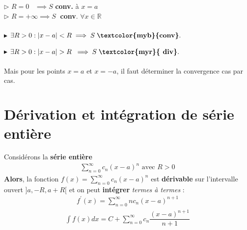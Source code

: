 \documentclass{report}
\begin{document}
\begin{multicols*}{3}
            \noindent$\rhd$
                $R = 0 \;\;\; \implies S$ \; 
                \textcolor{myb}{\textbf{conv.}}  à $x = a$ 
            \\
            $\rhd$  $R = +\infty \implies S \;$ 
            \textbf{conv}. \; $\forall x \in \mathbb{R}$  
            \\ \\
            $\blacktriangleright$ 
            $\exists R > 0 : |x - a| < R \implies  S \; \textbf{\textcolor{myb}{conv}}.$

            \noindent 
            $\blacktriangleright$ $\exists R > 0 : |x - a| > R \; \implies  S \;
            \textbf{\textcolor{myr}{ div}}.$   
            \\\\ 
            Mais pour les points $x = a$ et $x = -a$, il faut déterminer  
            la convergence cas par cas. 


    \vspace{-1em}
    \section{Dérivation et intégration de série entière}
    \vspace{-2em}
        Considérons la \textbf{série entière} 
        \begin{align*}
            \sum\limits_{n = 0}^{\infty}c_n(x - a)^n \text{ avec } R > 0
        \end{align*}                
        \textbf{Alors}, la fonction $f(x) =  \sum_{n=0}^{\infty }c_n(x - a)^n$ 
        est \textbf{\textcolor{myb}{dérivable}} 
        sur l'intervalle ouvert $]a, -R, a + R[$ et on peut 
        \textcolor{myb}{\textbf{intégrer}}    \textit{termes à termes} :  
        \begin{align*}
            f^{\prime}(x) = \sum_{n=0}^{\infty }nc_n(x - a)^{n + 1}
        \end{align*}
        \vspace{-1em} 
        \begin{align*}
            \int f(x)dx  = C + \sum_{n=0}^{\infty }c_n
            \dfrac{(x - a)^{n+1}}{n+1} 
        \end{align*}    



\end{multicols*}
\end{document}
